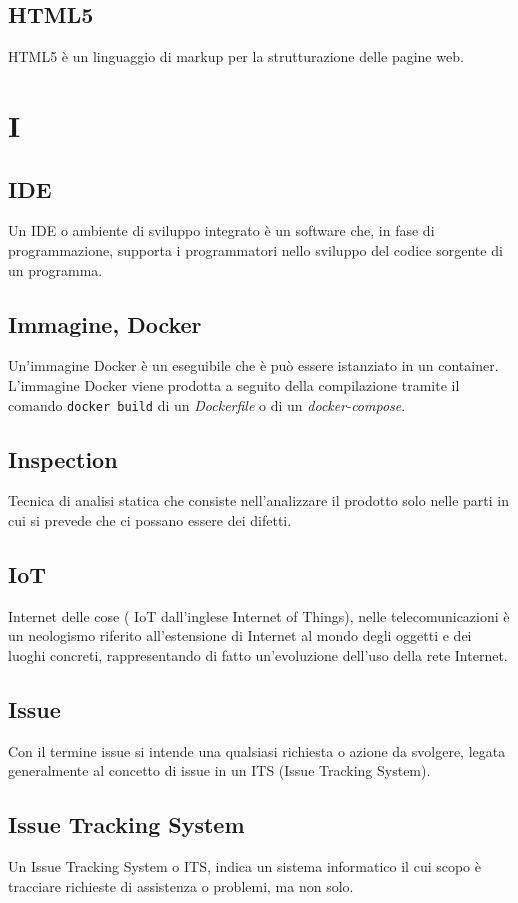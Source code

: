 \subsection{HTML5}  HTML5 è un linguaggio di markup per la strutturazione delle pagine web.

\newpage \section{I}
\subsection{IDE}   Un IDE o ambiente di sviluppo integrato è un software che, in fase di programmazione, supporta i programmatori nello sviluppo del codice sorgente di un programma.
\subsection{Immagine, Docker} Un'immagine Docker è un eseguibile che è può essere istanziato in un container. L'immagine Docker viene prodotta a seguito della compilazione tramite il comando \verb!docker build! di un \textit{Dockerfile} o di un \textit{docker-compose}.
\subsection{Inspection}  Tecnica di analisi statica che consiste nell'analizzare il prodotto solo nelle parti in cui si prevede che ci possano essere dei difetti.
\subsection{IoT }  Internet delle cose ( IoT dall'inglese Internet of Things), nelle telecomunicazioni è un neologismo riferito all'estensione di Internet al mondo degli oggetti e dei luoghi concreti, rappresentando di fatto un'evoluzione dell'uso della rete Internet.
\subsection{Issue}  Con il termine issue si intende una qualsiasi richiesta o azione da svolgere, legata generalmente al concetto di issue in un ITS (Issue Tracking System).
\subsection{Issue Tracking System}  Un Issue Tracking System o ITS, indica un sistema informatico il cui scopo è tracciare richieste di assistenza o problemi, ma non solo.



